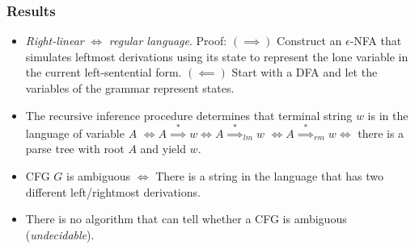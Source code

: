\subsubsection{Results}
\begin{itemize}
    \item \textit{Right-linear} $\iff $ \textit{regular language}. Proof: $(\implies)$ Construct an $\epsilon$-NFA that simulates leftmost derivations using its state to represent the lone variable in the current left-sentential form. $(\impliedby)$ Start with a DFA and let the variables of the grammar represent states.
    \item The recursive inference procedure determines that terminal string $w$ is in the language of variable $A$ $\iff A \overset{*}{\implies} w \iff A \overset{*}{\implies}_{lm} w$ $\iff A \overset{*}{\implies}_{rm}w \iff $ there is a parse tree with root $A$ and yield $w.$
    \item CFG $G$ is ambiguous $\iff$ There is a string in the language that has two different left/rightmost derivations.
    \item There is no algorithm that can tell whether a CFG is ambiguous (\textit{undecidable}).
\end{itemize}